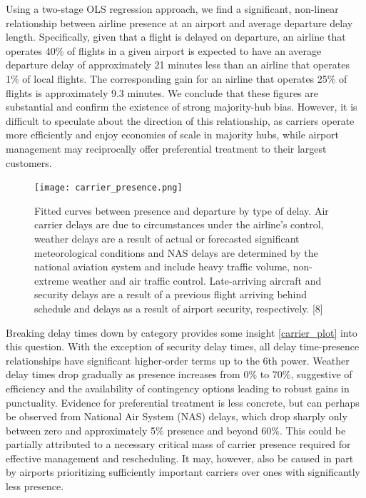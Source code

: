 \documentclass{article} %
\begin{document}
Using a two-stage OLS regression approach, we find a significant, non-linear relationship between airline presence at an airport and average departure delay length. Specifically, given that a flight is delayed on departure, an airline that operates 40\% of flights in a given airport is expected to have an average departure delay of approximately 21 minutes less than an airline that operates 1\% of local flights. The corresponding gain for an airline that operates 25\% of flights is approximately 9.3 minutes. We conclude that these figures are substantial and confirm the existence of strong majority-hub bias. However, it is difficult to speculate about the direction of this relationship, as carriers operate more efficiently and enjoy economies of scale in majority hubs, while airport management may reciprocally offer preferential treatment to their largest customers.

\begin{figure}[h]
\begin{center}

\texttt{[image: carrier\_presence.png]}
\caption{Fitted curves between presence and departure by type of delay. Air carrier delays are due to circumstances under the airline's control, weather delays are a result of actual or forecasted significant meteorological conditions and NAS delays are determined by the national aviation system and include heavy traffic volume, non-extreme weather and air traffic control. Late-arriving aircraft and security delays are a result of a previous flight arriving behind schedule and delays as a result of airport security, respectively. [8]\label{carrier_plot}}

\end{center}
\end{figure}

Breaking delay times down by category provides some insight \autoref{carrier_plot} into this question. With the exception of security delay times, all delay time-presence relationships have significant higher-order terms up to the 6th power. Weather delay times drop gradually as presence increases from 0\% to 70\%, suggestive of efficiency and the availability of contingency options leading to robust gains in punctuality. Evidence for preferential treatment is less concrete, but can perhaps be observed from National Air System (NAS) delays, which drop sharply only between zero and approximately 5\% presence and beyond 60\%. This could be partially attributed to a necessary critical mass of carrier presence required for effective management and rescheduling. It may, however, also be caused in part by airports prioritizing sufficiently important carriers over ones with significantly less presence.
\end{document}
